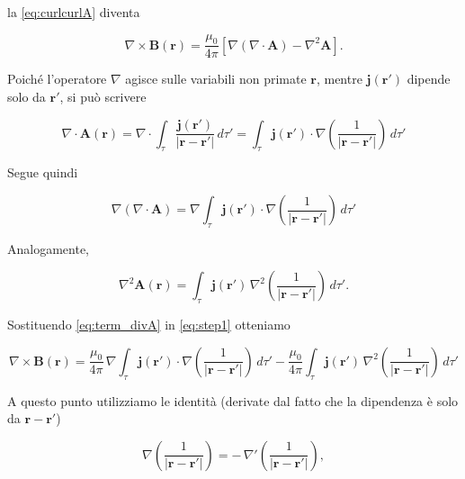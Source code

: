 la \ref{eq:curlcurlA} diventa

\begin{equation}\label{eq:step1}
    \nabla \times \mathbf B(\mathbf r)
    =
    \frac{\mu_0}{4\pi}\left[
    \nabla(\nabla\cdot \mathbf A)-\nabla^2\mathbf A
    \right].
\end{equation}

Poiché l'operatore $\nabla$ agisce sulle variabili non primate $\mathbf r$, mentre $\mathbf j(\mathbf r')$ dipende solo da $\mathbf r'$, si può scrivere

\begin{equation*}
    \nabla\cdot \mathbf A(\mathbf r)
    =
    \nabla\cdot \int_{\tau}\frac{\mathbf j(\mathbf r')}{|\mathbf r-\mathbf r'|}\,d\tau'
    =
    \int_{\tau}\mathbf j(\mathbf r')\cdot \nabla\!\left(\frac{1}{|\mathbf r-\mathbf r'|}\right)\,d\tau'
\end{equation*}

Segue quindi

\begin{equation}\label{eq:term_divA}
    \nabla(\nabla\cdot \mathbf A)
    =
    \nabla \int_{\tau}\mathbf j(\mathbf r')\cdot \nabla\!\left(\frac{1}{|\mathbf r-\mathbf r'|}\right)\,d\tau'
\end{equation}

Analogamente,

\begin{equation*}
    \nabla^2\mathbf A(\mathbf r)
    =
    \int_{\tau}\mathbf j(\mathbf r')\,\nabla^2\!\left(\frac{1}{|\mathbf r-\mathbf r'|}\right)\,d\tau'.
\end{equation*}

Sostituendo \ref{eq:term_divA} in \ref{eq:step1} otteniamo

\begin{equation}\label{eq:step2}
    \nabla \times \mathbf B(\mathbf r)
    =
    \frac{\mu_0}{4\pi}\,
    \nabla \int_{\tau}\mathbf j(\mathbf r')\cdot \nabla\!\left(\frac{1}{|\mathbf r-\mathbf r'|}\right)\,d\tau'
    -\frac{\mu_0}{4\pi}\int_{\tau}\mathbf j(\mathbf r')\,\nabla^2\!\left(\frac{1}{|\mathbf r-\mathbf r'|}\right)\,d\tau'
\end{equation}

A questo punto utilizziamo le identità (derivate dal fatto che la dipendenza è solo da $\mathbf r-\mathbf r'$)

\begin{equation}
    \nabla\!\left(\frac{1}{|\mathbf r-\mathbf r'|}\right)
    = -\,\nabla'\!\left(\frac{1}{|\mathbf r-\mathbf r'|}\right),
\end{equation}

